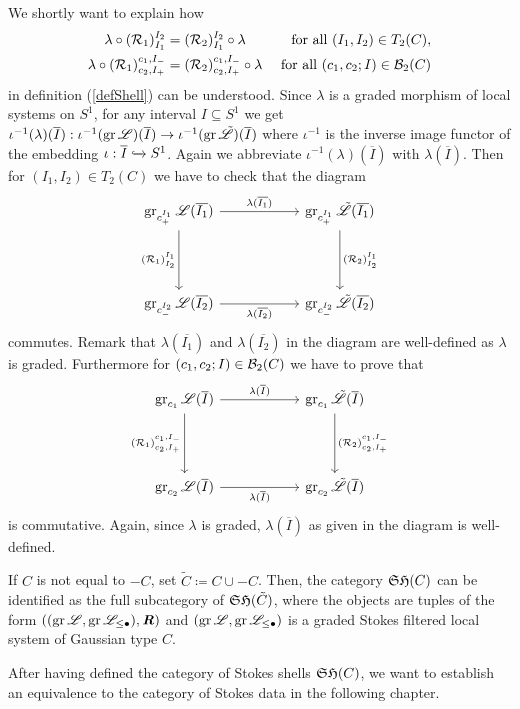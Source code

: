 \begin{rem}
    We shortly want to explain how 
    \begin{align*}
        \lambda \circ (\mathcal{R}_1)^{I_2}_{I_1} & = (\mathcal{R}_2)^{I_2}_{I_1} \circ \lambda &\text{ for all } (I_1,I_2) \in T_2(C), \\
        \lambda \circ (\mathcal{R}_1)^{c_1,I_-}_{c_2,I_+} & = (\mathcal{R}_2)^{c_1,I_-}_{c_2,I_+} \circ \lambda & \text{ for all }(c_1,c_2;I) \in \mathcal{B}_2(C)
    \end{align*}
    in definition (\ref{defShell}) can be understood. Since $\lambda$ is a graded morphism of local systems on $S^1$, for any interval $I \subseteq S^1$ we get $\iota^{-1}(\lambda)(\overline{I}):\iota^{-1}(\operatorname{gr}\mathscr{L})(\overline{I}) \to \iota^{-1}(\operatorname{gr}\tilde{\mathscr{L}})(\overline{I})$ where $\iota^{-1}$ is the inverse image functor of the embedding $\iota: \overline{I} \xhookrightarrow{} S^1$. Again we abbreviate $\iota^{-1}(\lambda)(\overline{I})$ with $\lambda(\overline{I})$. Then for $(I_1,I_2)\in T_2(C)$ we have to check that the diagram
    \[
        \begin{tikzcd}[row sep=1.5cm, column sep=2cm]
         & \gr_{c_+^{I_1}}\Lo(\overline{I_1}) \arrow[d, swap, "(\Rc_1)_{I_2}^{I_1}"] \arrow[r, "\lambda(\overline{I_1})"] & \gr_{c_+^{I_1}}\tilde{\Lo}(\overline{I_1}) \arrow[d, "(\Rc_2)_{I_2}^{I_1}"]& \\
        & \gr_{c_-^{I_2}}\Lo(\overline{I_2}) \arrow[r, swap, "\lambda(\overline{I_2})"] &  \gr_{c_-^{I_2}}\tilde{\Lo}(\overline{I_2})& 
        \end{tikzcd}
    \] 
    commutes. Remark that $\lambda(\overline{I_1})$ and $\lambda(\overline{I_2})$ in the diagram are well-defined as $\lambda$ is graded. Furthermore for $(c_1,c_2;I) \in \mathcal{B}_2(C)$ we have to prove that 
     \[
        \begin{tikzcd}[row sep=1.5cm, column sep=2cm]
         & \gr_{c_1}\Lo(\overline{I}) \arrow[d, swap, "(\Rc_1)_{c_2,I_+}^{c_1,I_-}"] \arrow[r, "\lambda(\overline{I})"] & \gr_{c_1}\tilde{\Lo}(\overline{I}) \arrow[d, "(\Rc_2)_{c_2,I_+}^{c_1,I_-}"]& \\
        & \gr_{c_2}\Lo(\overline{I}) \arrow[r, swap, "\lambda(\overline{I})"] &  \gr_{c_2}\tilde{\Lo}(\overline{I})& 
        \end{tikzcd}
    \] 
    is commutative. Again, since $\lambda$ is graded, $\lambda(\overline{I})$ as given in the diagram is well-defined.
\end{rem}

\begin{rem}
    If $C$ is not equal to $-C$, set $\tilde{C} \coloneqq C \cup -C$. Then, the category $\mathfrak{SH}(C)$ can be identified as the full subcategory of $\mathfrak{SH}(\tilde{C})$, where the objects are tuples of the form $((\operatorname{gr}\mathscr{L},\operatorname{gr}\mathscr{L}_{\leq \bullet}), \bm{\mathit{R}})$ and $(\operatorname{gr}\mathscr{L},\operatorname{gr}\mathscr{L}_{\leq \bullet})$ is a graded Stokes filtered local system of Gaussian type $C$.
\end{rem}



After having defined the category of Stokes shells $\mathfrak{SH}(C)$, we want to establish an equivalence to the category of Stokes data in the following chapter.